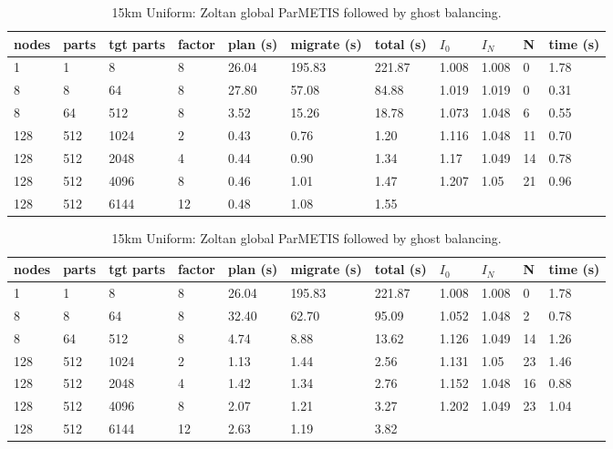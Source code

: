 \documentclass[a4paper]{article}
\begin{document}
\begin{table}
\caption{\label{tab:15kmlg}15km Uniform: Zoltan local ParMETIS followed by ghost balancing.}
\begin{tabular}{  l | l | l | l | l | l | l | l | l | l | l }
    \hline
    nodes & parts & tgt parts & factor & plan (s) & migrate (s) & total (s) & $I_0$ & $I_N$ & N & time (s) \\ \hline
    1 & 1 & 8 & 8 & 26.04 & 195.83 & 221.87 & 1.008 & 1.008 & 0 & 1.78 \\ 
    8 & 8 & 64 & 8 & 27.80 & 57.08 & 84.88 & 1.019 & 1.019 & 0 & 0.31 \\ 
    8 & 64 & 512 & 8 & 3.52 & 15.26 & 18.78 & 1.073 & 1.048 & 6 & 0.55 \\ 
    128 & 512 & 1024 & 2 & 0.43 & 0.76 & 1.20 & 1.116 & 1.048 & 11 & 0.70 \\ 
    128 & 512 & 2048 & 4 & 0.44 & 0.90 & 1.34 & 1.17 & 1.049 & 14 & 0.78 \\ 
    128 & 512 & 4096 & 8 & 0.46 & 1.01 & 1.47 & 1.207 & 1.05 & 21 & 0.96 \\ 
    128 & 512 & 6144 & 12 & 0.48 & 1.08 & 1.55 &  &  &  &  \\ 
\end{tabular}

\caption{\label{tab:15kmgg}15km Uniform: Zoltan global ParMETIS followed by ghost balancing.}
\begin{tabular}{  l | l | l | l | l | l | l | l | l | l | l }
    \hline
    nodes & parts & tgt parts & factor & plan (s) & migrate (s) & total (s) & $I_0$ & $I_N$ & N & time (s) \\ \hline
      1 & 1 & 8 & 8 & 26.04 & 195.83 & 221.87 & 1.008 & 1.008 & 0 & 1.78 \\ 
      8 & 8 & 64 & 8 & 32.40 & 62.70 & 95.09 & 1.052 & 1.048 & 2 & 0.78 \\ 
      8 & 64 & 512 & 8 & 4.74 & 8.88 & 13.62 & 1.126 & 1.049 & 14 & 1.26 \\ 
      128 & 512 & 1024 & 2 & 1.13 & 1.44 & 2.56 & 1.131 & 1.05 & 23 & 1.46 \\ 
      128 & 512 & 2048 & 4 & 1.42 & 1.34 & 2.76 & 1.152 & 1.048 & 16 & 0.88 \\ 
      128 & 512 & 4096 & 8 & 2.07 & 1.21 & 3.27 & 1.202 & 1.049 & 23 & 1.04 \\ 
      128 & 512 & 6144 & 12 & 2.63 & 1.19 & 3.82 &  &  &  & \  \\ 
\end{tabular}


\end{table}
\end{document}
